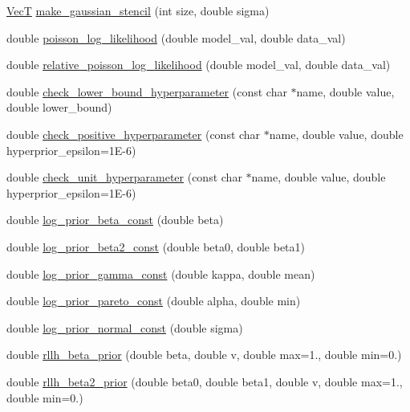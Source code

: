 \begin{DoxyCompactItemize}
\item 
\hyperlink{namespacemappel_a2225ad69f358daa3f4f99282a35b9a3a}{VecT} \hyperlink{namespacemappel_ae7764483ad8e545319cacd2e91a1a849}{make\+\_\+gaussian\+\_\+stencil} (int size, double sigma)
\item 
double \hyperlink{namespacemappel_ad6479b1e317a5f3bd2b92bfb562938d5}{poisson\+\_\+log\+\_\+likelihood} (double model\+\_\+val, double data\+\_\+val)
\item 
double \hyperlink{namespacemappel_a6e36ec38eee9f05906f51d4db8767b9e}{relative\+\_\+poisson\+\_\+log\+\_\+likelihood} (double model\+\_\+val, double data\+\_\+val)
\item 
double \hyperlink{namespacemappel_a9cd993c2d585a15b80f46d8d97381a0f}{check\+\_\+lower\+\_\+bound\+\_\+hyperparameter} (const char $\ast$name, double value, double lower\+\_\+bound)
\item 
double \hyperlink{namespacemappel_a545d3aeb521b1d098e8f060fbd24d5b3}{check\+\_\+positive\+\_\+hyperparameter} (const char $\ast$name, double value, double hyperprior\+\_\+epsilon=1\+E-\/6)
\item 
double \hyperlink{namespacemappel_af170ce3945b79af54277394ff3f62843}{check\+\_\+unit\+\_\+hyperparameter} (const char $\ast$name, double value, double hyperprior\+\_\+epsilon=1\+E-\/6)
\item 
double \hyperlink{namespacemappel_a9ca8f4d711a32790757590f2c60fa4cb}{log\+\_\+prior\+\_\+beta\+\_\+const} (double beta)
\item 
double \hyperlink{namespacemappel_aa76d20f90640303c9be2fd56a064aa56}{log\+\_\+prior\+\_\+beta2\+\_\+const} (double beta0, double beta1)
\item 
double \hyperlink{namespacemappel_a0485d74207be2d753c06a572693dd365}{log\+\_\+prior\+\_\+gamma\+\_\+const} (double kappa, double mean)
\item 
double \hyperlink{namespacemappel_ac21a7ae00d6e2d4baf30cbccc07ba70e}{log\+\_\+prior\+\_\+pareto\+\_\+const} (double alpha, double min)
\item 
double \hyperlink{namespacemappel_a514175d403ab15aa5bd58d0f96d8f79d}{log\+\_\+prior\+\_\+normal\+\_\+const} (double sigma)
\item 
double \hyperlink{namespacemappel_aba911d3a1a1a486fd6f6dfdfad37d90a}{rllh\+\_\+beta\+\_\+prior} (double beta, double v, double max=1., double min=0.)
\item 
double \hyperlink{namespacemappel_aaf6a672122290a7cb20a0d1c65661db7}{rllh\+\_\+beta2\+\_\+prior} (double beta0, double beta1, double v, double max=1., double min=0.)

\end{DoxyCompactItemize}
